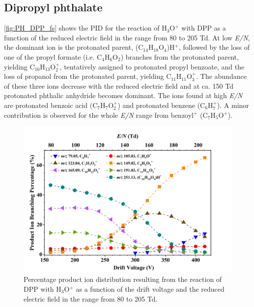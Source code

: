 %





\subsection{Dipropyl phthalate}


\autoref{fig:PH_DPP_fs} shows the PID for the reaction of H$_3$O$^+$ with DPP as a function of the reduced electric field in the range from 80 to 205 Td.
%
At low \textit{E/N}, the dominant ion is the protonated parent, (C$_{14}$H$_{18}$O$_4$)H$^+$, followed by the  loss of one of the propyl formate (i.e. C$_4$H$_6$O$_2$) branches from the protonated parent, yielding C$_{10}$H$_{13}$O$_2^+$, tentatively assigned to protonated propyl benzoate, and the loss of propanol from the protonated parent, yielding C$_{11}$H$_{11}$O$_3^+$. 
%
The abundance of these three ions decrease with the reduced electric field and at ca. 150 Td protonated phthalic anhydride becomes dominant.
%
The ions found at high \textit{E/N} are protonated benzoic acid (C$_{7}$H$_{7}$O$_2^+$) and  protonated benzene (C$_6$H$_{7}^+$).
A minor contribution is observed for the whole \textit{E/N} range from benzoyl$^+$ (C$_7$H$_{5}$O$^+$).

    \begin{figure}[htb]%
    \centering
    \includegraphics[height=0.35\textheight]{pics/DPP-BR.png}
    \caption{Percentage product ion distribution resulting from the reaction of DPP with H$_3$O$^+$ as a function of the drift voltage and the reduced electric field in the range from 80 to 205 Td.}
    \label{fig:PH_DPP_fs}
    \end{figure}
%



